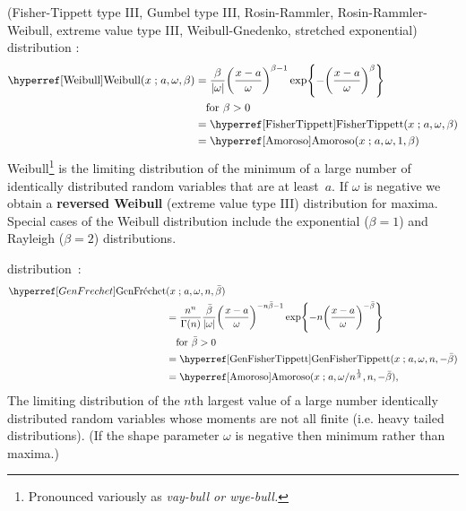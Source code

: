 (Fisher-Tippett type III, Gumbel type III, Rosin-Rammler, Rosin-Rammler-Weibull, extreme value type III, Weibull-Gnedenko, stretched exponential) distribution \cite{Weibull1951,Johnson1995}: 
\begin{align}
\label{Weibull}
\opr{Weibull}(x \given a ,\omega, \beta) 
&=	\frac{\beta}{| \omega |} \Left(\frac{x-a }{\omega}\Right)^{\beta-1} \exp\Left\{-\Left(\frac{x-a }{\omega}\Right)^{\beta}\Right\}  \checked
\\ \notag &\quad \text{for } \beta>0 
\\ \notag
& = \opr{FisherTippett}(x\given  a, \omega, \beta) \checked
\\ \notag
&= \opr{Amoroso}(x\given  a , \omega, 1, \beta)  \checked
\end{align}
Weibull\footnote{Pronounced variously as \sl{vay-bull} or \sl{wye-bull}.} is the limiting distribution of the minimum of a large number of  identically distributed random variables that are at least~$a$.  If $\omega$ is negative we obtain a {\bf reversed Weibull} (extreme value type III) distribution for maxima.
Special cases of the Weibull distribution include the exponential ($\beta=1$) and Rayleigh ($\beta=2$)  distributions.

 distribution~\cite{Smirnov1949,Barndorff-Nielsen1963}:
\begin{align}
\label{GenFrechet}
\GenFrechet&(x \given a , \omega, n, \bar{\beta}) 
\\
 \notag 
&=	\frac{n^n}{\Gamma(n)}  \frac{\bar{\beta}}{| \omega |} \Left(\frac{x-a }{\omega}\Right)^{-n\bar{\beta}-1} 
\exp\Left\{-n\Left(\frac{x-a }{\omega}\Right)^{-\bar{\beta}}\Right\} 
\checked
\\ &\quad \text{for } \bar{\beta}>0  \notag
\\ \notag
& = \opr{GenFisherTippett}(x\given a, \omega, n, -\bar{\beta})
\checked
\\ \notag
&= \opr{Amoroso}(x\given  a , {\omega}/{n^{\frac{1}{\beta} }},n,-\bar{\beta}),
\checked
\end{align}
The limiting distribution of the $n$th largest value of a large number identically distributed random variables whose moments are not all finite (i.e. heavy tailed distributions).  (If the shape parameter $\omega$ is negative then minimum rather than maxima.)



